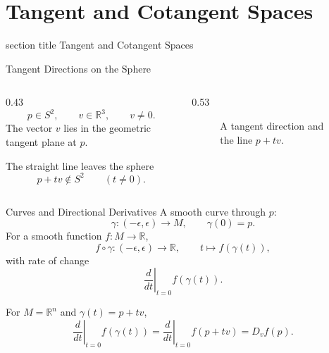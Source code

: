 \documentclass[aspectratio=169,11pt]{beamer}
\newcommand{\slidetitlesection}[1]{%
  \section{#1}%
  \begin{frame}
    \vfill
    \begin{beamercolorbox}[sep=12pt,center,wd=\paperwidth]{section title}
      \usebeamerfont{section title}\insertsectionnumber\quad #1
    \end{beamercolorbox}
    \vfill
  \end{frame}%
}
\begin{document}

\slidetitlesection{Tangent and Cotangent Spaces}

\begin{frame}{Tangent Directions on the Sphere}
  \begin{columns}[c,onlytextwidth]
    \begin{column}{0.43\textwidth}
      \begin{equation}
        p\in S^2,\qquad v\in\mathbb{R}^3,\qquad v\ne0.
      \end{equation}
      The vector $v$ lies in the geometric tangent plane at $p$.
      \begin{block}{The straight line leaves the sphere}
        \begin{equation}
          p+tv\notin S^2\qquad(t\ne0).
        \end{equation}
      \end{block}
    \end{column}
    \begin{column}{0.53\textwidth}
      \begin{figure}
        \centering
        \resizebox{0.91\linewidth}{!}{}
        \caption{A tangent direction and the line $p+tv$.}
        \label{fig:slides-tangent-direction}
      \end{figure}
    \end{column}
  \end{columns}
\end{frame}

\begin{frame}{Curves and Directional Derivatives}
  A smooth curve through $p$:
  \begin{equation}
    \gamma\colon(-\epsilon,\epsilon)\to M,\qquad\gamma(0)=p.
  \end{equation}
  For a smooth function $f\colon M\to\mathbb{R}$,
  \begin{equation}
    f\circ\gamma\colon(-\epsilon,\epsilon)\to\mathbb{R},
    \qquad t\mapsto f(\gamma(t)),
  \end{equation}
  with rate of change
  \begin{equation}
    \left.\frac{d}{dt}\right|_{t=0}f(\gamma(t)).
  \end{equation}
  \begin{example}
    For $M=\mathbb{R}^n$ and $\gamma(t)=p+tv$,
    \begin{equation}
      \left.\frac{d}{dt}\right|_{t=0}f(\gamma(t))
      =\left.\frac{d}{dt}\right|_{t=0}f(p+tv)=D_vf(p).
    \end{equation}
  \end{example}
\end{frame}
\end{document}
